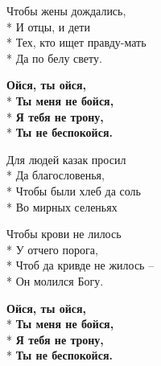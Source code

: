 \begin{minipage}{\linewidth}
Чтобы жены дождались,\\*
И отцы, и дети\\*
Тех, кто ищет правду-мать\\*
Да по белу свету.\\
\end{minipage}\par\medskip\nobreak

\medskip

\begin{minipage}{\linewidth}
\hspace*{1.5em}\textbf{Ойся, ты ойся,}\\*
\hspace*{1.5em}\textbf{Ты меня не бойся,}\\*
\hspace*{1.5em}\textbf{Я тебя не трону,}\\*
\hspace*{1.5em}\textbf{Ты не беспокойся.}\\
\end{minipage}\par\medskip\nobreak

\medskip

\begin{minipage}{\linewidth}
Для людей казак просил\\*
Да благословенья,\\*
Чтобы были хлеб да соль\\*
Во мирных селеньях\\
\end{minipage}\par\medskip\nobreak

\medskip

\begin{minipage}{\linewidth}
Чтобы крови не лилось\\*
У отчего порога,\\*
Чтоб да кривде не жилось –\\*
Он молился Богу.\\
\end{minipage}\par\medskip\nobreak

\medskip

\begin{minipage}{\linewidth}
\hspace*{1.5em}\textbf{Ойся, ты ойся,}\\*
\hspace*{1.5em}\textbf{Ты меня не бойся,}\\*
\hspace*{1.5em}\textbf{Я тебя не трону,}\\*
\hspace*{1.5em}\textbf{Ты не беспокойся.}\\
\end{minipage}\par\medskip\nobreak

